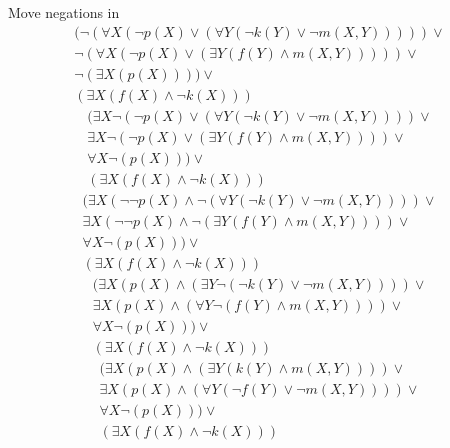 \documentclass{article}
\begin{document}
Move negations in
\begin{equation*}
\begin{aligned}
(\lnot ( \forall X (\lnot p(X) \lor ( \forall Y ( \lnot k(Y) \lor \lnot m(X,Y))))) \lor \\
\lnot (\forall X ( \lnot p(X) \lor ( \exists Y ( f(Y) \land m(X,Y)))) ) \lor \\
\lnot (\exists X (p(X)))) \lor \\
( \exists X (f(X) \land \lnot k(X)) )
\end{aligned}
\end{equation*}
\begin{equation*}
\begin{aligned}
(\exists X \lnot (\lnot p(X) \lor ( \forall Y ( \lnot k(Y) \lor \lnot m(X,Y)))) \lor \\
\exists X \lnot ( \lnot p(X) \lor ( \exists Y ( f(Y) \land m(X,Y)))) \lor \\
\forall X \lnot (p(X))) \lor \\
( \exists X (f(X) \land \lnot k(X)) )
\end{aligned}
\end{equation*}
\begin{equation*}
\begin{aligned}
(\exists X ( \lnot \lnot p(X) \land \lnot ( \forall Y ( \lnot k(Y) \lor \lnot m(X,Y)))) \lor \\
\exists X ( \lnot \lnot p(X) \land \lnot ( \exists Y ( f(Y) \land m(X,Y)))) \lor \\
\forall X \lnot (p(X))) \lor \\
( \exists X (f(X) \land \lnot k(X)) )
\end{aligned}
\end{equation*}
\begin{equation*}
\begin{aligned}
(\exists X ( p(X) \land ( \exists Y \lnot ( \lnot k(Y) \lor \lnot m(X,Y)))) \lor \\
\exists X ( p(X) \land ( \forall Y \lnot ( f(Y) \land m(X,Y)))) \lor \\
\forall X \lnot (p(X))) \lor \\
( \exists X (f(X) \land \lnot k(X)) )
\end{aligned}
\end{equation*}
\begin{equation*}
\begin{aligned}
(\exists X ( p(X) \land ( \exists Y ( k(Y) \land m(X,Y)))) \lor \\
\exists X ( p(X) \land ( \forall Y ( \lnot f(Y) \lor \lnot m(X,Y)))) \lor \\
\forall X \lnot (p(X))) \lor \\
( \exists X (f(X) \land \lnot k(X)) )
\end{aligned}
\end{equation*}
\end{document}
